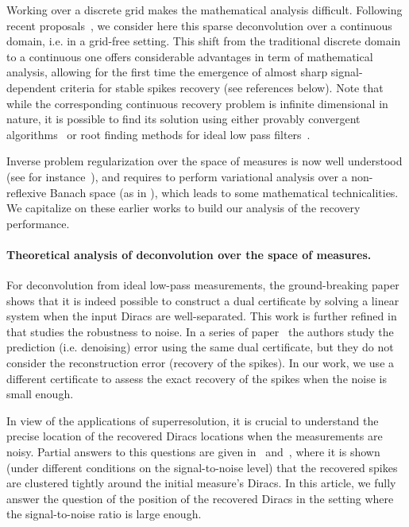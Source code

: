 Working over a discrete grid makes the mathematical analysis difficult. Following recent proposals~\cite{deCastro-beurling,Bredies-space-measures,Candes-toward,Bhaskar-line-spectral}, we consider here this sparse deconvolution over a continuous domain, i.e. in a grid-free setting. This shift from the traditional discrete domain to a continuous one offers considerable advantages in term of mathematical analysis, allowing for the first time the emergence of almost sharp signal-dependent criteria for stable spikes recovery (see references below).  Note that while the corresponding continuous recovery problem is infinite dimensional in nature, it is possible to find its solution using either provably convergent algorithms~\cite{Bredies-space-measures} or root finding methods for ideal low pass filters~\cite{Candes-toward}.

Inverse problem regularization over the space of measures is now well understood (see for instance~\cite{Scherzer-ssvm,Bredies-space-measures}), and requires to perform variational analysis over a non-reflexive Banach space (as in \cite{Hofmann-measures}), which leads to some mathematical technicalities. We capitalize on these earlier works to build our analysis of the recovery performance. 


\paragraph{Theoretical analysis of deconvolution over the space of measures.} 


For deconvolution from ideal low-pass measurements, the ground-breaking paper~\cite{Candes-toward} shows that it is indeed possible to construct a dual certificate by solving a linear system when the input Diracs are well-separated. This work is further refined in~\cite{Candes-superresol-noisy} that studies the robustness to noise. In a series of paper~\cite{Bhaskar-line-spectral,Tang-linea-spectral} the authors study the prediction (i.e. denoising) error using the same dual certificate, but they do not consider the reconstruction error (recovery of the spikes). In our work, we use a different certificate to assess the exact recovery of the spikes when the noise is small enough.

In view of the applications of superresolution, it is crucial to understand the precise location of the recovered Diracs locations when the measurements are noisy. Partial answers to this questions are given in~\cite{Fernandez-Granda-support} and~\cite{Azais-inaccurate}, where it is shown (under different conditions on the signal-to-noise level) that the recovered spikes are clustered tightly around the initial measure's Diracs. In this article, we fully answer the question of the position of the recovered Diracs in the setting where the signal-to-noise ratio is large enough. 

